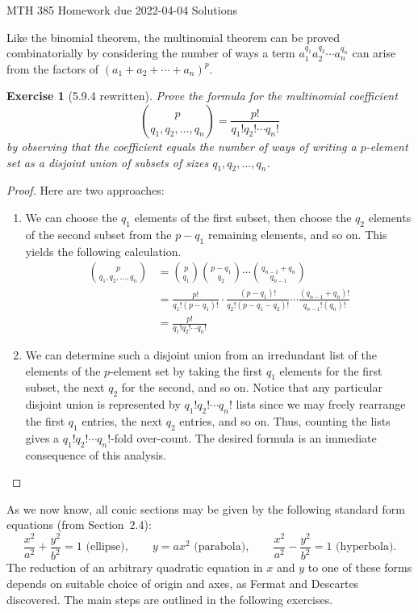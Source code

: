 \documentclass[12pt]{article}
\theoremstyle{plain}
\newtheorem{ex}{Exercise}
\begin{document}
MTH 385 \qquad Homework due 2022-04-04 Solutions

Like the binomial theorem, the multinomial theorem can be proved combinatorially by considering the number of ways a term $a_1^{q_1}a_2^{q_2}\cdots a_n^{q_n}$ can arise from the factors of $(a_1+a_2+\cdots+a_n)^p$.

\begin{ex} [5.9.4 rewritten]
  Prove the formula for the multinomial coefficient
  \[
    \binom{p}{q_1,q_2,\ldots,q_n}=\frac{p!}{q_1!q_2!\cdots q_n!}
  \]
  by observing that the coefficient equals the number of ways of writing a $p$-element set as a disjoint union of subsets of sizes $q_1,q_2,\ldots,q_n$.
\end{ex}

\begin{proof}
  Here are two approaches:
  \begin{enumerate}[1.]
    \item We can choose the $q_1$ elements of the first subset, then choose the $q_2$ elements of the second subset from the $p-q_1$ remaining elements, and so on. This yields the following calculation.
    \begin{align*}
      \binom{p}{q_1,q_2,\ldots,q_n} &= \binom{p}{q_1}\binom{p-q_1}{q_2}\cdots\binom{q_{n-1}+q_n}{q_{n-1}} \\
        &= \frac{p!}{q_1!(p-q_1)!}\cdot\frac{(p-q_1)!}{q_2!(p-q_1-q_2)!}\cdots\frac{(q_{n-1}+q_n)!}{q_{n-1}!(q_n)!} \\
        &= \frac{p!}{q_1!q_2!\cdots q_n!}
    \end{align*}
    \item We can determine such a disjoint union from an irredundant list of the elements of the $p$-element set by taking the first $q_1$ elements for the first subset, the next $q_2$ for the second, and so on. Notice that any particular disjoint union is represented by $q_1!q_2!\cdots q_n!$ lists since we may freely rearrange the first $q_1$ entries, the next $q_2$ entries, and so on. Thus, counting the lists gives a $q_1!q_2!\cdots q_n!$-fold over-count. The desired formula is an immediate consequence of this analysis.
  \end{enumerate}
\end{proof}

As we now know, all conic sections may be given by the following standard form equations (from Section~2.4):
\[
  \frac{x^2}{a^2}+\frac{y^2}{b^2}=1\text{ (ellipse)},\qquad y=ax^2\text{ (parabola)},\qquad  \frac{x^2}{a^2}-\frac{y^2}{b^2}=1\text{ (hyperbola)}.
\]
The reduction of an arbitrary quadratic equation in $x$ and $y$ to one of these forms depends on suitable choice of origin and axes, as Fermat and Descartes discovered. The main steps are outlined in the following exercises.
\end{document}
